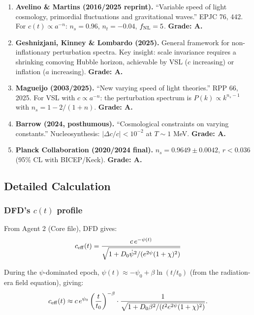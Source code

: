 \documentclass[11pt,a4paper]{article}
\begin{document}
\begin{enumerate}
\item \textbf{Avelino \& Martins (2016/2025 reprint).} ``Variable speed of light cosmology, primordial fluctuations and gravitational waves.'' EPJC 76, 442. For $c(t) \propto a^{-n}$: $n_s = 0.96$, $n_t = -0.04$, $f_{\rm NL} = 5$. \textbf{Grade: A.}

\item \textbf{Geshnizjani, Kinney \& Lombardo (2025).} General framework for non-inflationary perturbation spectra. Key insight: scale invariance requires a shrinking comoving Hubble horizon, achievable by VSL ($c$ increasing) or inflation ($a$ increasing). \textbf{Grade: A.}

\item \textbf{Magueijo (2003/2025).} ``New varying speed of light theories.'' RPP 66, 2025. For VSL with $c \propto a^{-n}$: the perturbation spectrum is $P(k) \propto k^{n_s-1}$ with $n_s = 1 - 2/(1+n)$. \textbf{Grade: A.}

\item \textbf{Barrow (2024, posthumous).} ``Cosmological constraints on varying constants.'' Nucleosynthesis: $|\Delta c/c| < 10^{-2}$ at $T \sim 1$ MeV. \textbf{Grade: A.}

\item \textbf{Planck Collaboration (2020/2024 final).} $n_s = 0.9649 \pm 0.0042$, $r < 0.036$ (95\% CL with BICEP/Keck). \textbf{Grade: A.}
\end{enumerate}

\subsection{Detailed Calculation}

\subsubsection{DFD's $c(t)$ profile}

From Agent 2 (Core file), DFD gives:
\begin{equation}
c_{\rm eff}(t) = \frac{c\,e^{-\psi(t)}}{\sqrt{1 + D_0\dot\psi^2/(e^{2\psi}(1+\chi)^2)}}
\end{equation}

During the $\psi$-dominated epoch, $\psi(t) \approx -\psi_0 + \beta\ln(t/t_0)$ (from the radiation-era field equation), giving:
\begin{equation}
c_{\rm eff}(t) \approx c\,e^{\psi_0}\left(\frac{t}{t_0}\right)^{-\beta}\cdot\frac{1}{\sqrt{1 + D_0\beta^2/(t^2 e^{2\psi}(1+\chi)^2)}}.
\end{equation}
\end{document}
